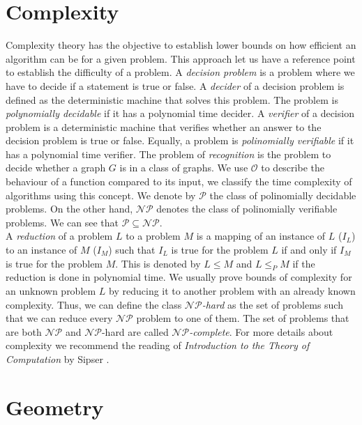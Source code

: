 \section{Complexity}

Complexity theory has the objective to establish lower bounds on how efficient an algorithm can be for a given problem. This approach let us have a reference point to establish the difficulty of a problem. A \emph{decision problem} is a problem where we have to decide if a statement is true or false. A \emph{decider} of a decision problem is defined as the deterministic machine that solves this problem. The problem is \emph{polynomially decidable} if it has a polynomial time decider. A \emph{verifier} of a decision problem is a deterministic machine that verifies whether an answer to the decision problem is true or false. Equally, a problem is \emph{polinomially verifiable} if it has a polynomial time verifier. The problem of \emph{recognition} is the problem to decide whether a graph $G$ is in a class of graphs. We use $\mathcal{O}$ to describe the behaviour of a function compared to its input, we classify the time complexity of algorithms using this concept. We denote by $\mathcal{P}$ the class of polinomially decidable problems. On the other hand, $\mathcal{NP}$ denotes the class of polinomially verifiable problems. We can see that $\mathcal{P} \subseteq \mathcal{NP}$.\\

A \emph{reduction} of a problem $L$ to a problem $M$ is a mapping of an instance of $L$ ($I_L$) to an instance of $M$ ($I_M$) such that $I_L$ is true for the problem $L$ if and
only if $I_M$ is true for the problem $M$. This is denoted by $L \leq M$ and $L \leq_P M$ if the reduction is done in polynomial time. We usually prove bounds of complexity for an unknown problem $L$ by reducing it to another problem with an already known complexity. Thus, we can define the class \emph{$\mathcal{NP}$-hard} as the set of problems such that we can reduce every $\mathcal{NP}$ problem to one of them. The set of problems that are both $\mathcal{NP}$ and $\mathcal{NP}$-hard are called \emph{$\mathcal{NP}$-complete}. For more details about complexity we recommend the reading of \textit{Introduction to the Theory of Computation} by Sipser \cite{sipserIntroductionTheoryComputation2006}.

\section{Geometry}

